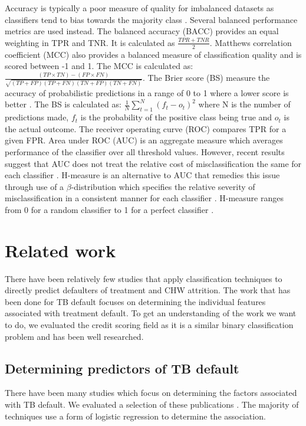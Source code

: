 \documentclass{sig-alternate-05-2015}
\begin{document}
	Accuracy is typically a poor measure of quality for imbalanced datasets as classifiers tend to bias towards the majority class \cite{Batista:2004:SBS:1007730.1007735, Chawla:2004:ESI:1007730.1007733}. Several balanced performance metrics are used instead. The balanced accuracy (BACC) provides an equal weighting in TPR and TNR. It is calculated as $\frac{TPR + TNR}{2}$. Matthews correlation coefficient (MCC) also provides a balanced measure of classification quality and is scored between -1 and 1. The MCC is calculated as: $\frac{(TP \times TN) - (FP \times FN)}{\sqrt{(TP + FP)(TP + FN)(TN + FP)(TN + FN)}}$. The Brier score (BS) measure the accuracy of probabilistic predictions in a range of 0 to 1 where a lower score is better \cite{steyerberg2010assessing}. The BS is calculated as: $\frac{1}{N}\sum_{t=1}^{N}(f_t - o_t)^2$ where N is the number of predictions made, $f_t$ is the probability of the positive class being true and $o_t$ is the actual outcome. The receiver operating curve (ROC) compares TPR for a given FPR. Area under ROC (AUC) is an aggregate measure which averages performance of the classifier over all threshold values. However, recent results suggest that AUC does not treat the relative cost of misclassification the same for each classifier \cite{Hand:2009:MCP:1612990.1613009}. H-measure is an alternative to AUC that remedies this issue through use of a $\beta$-distribution which specifies the relative severity of misclassification in a consistent manner for each classifier \cite{Hand:2009:MCP:1612990.1613009}. H-measure ranges from 0 for a random classifier to 1 for a perfect classifier \cite{Hand:2009:MCP:1612990.1613009}.
	
	\section{Related work}
	There have been relatively few studies that apply classification techniques to directly predict defaulters of treatment and CHW attrition. The work that has been done for TB default focuses on determining the individual features associated with treatment default. To get an understanding of the work we want to do, we evaluated the credit scoring field as it is a similar binary classification problem and has been well researched. 
	\subsection{Determining predictors of TB default}
	\label{predictors_of_defaulters_related_work}
	There have been many studies which focus on determining the factors associated with TB default. We evaluated a selection of these publications \cite{chan:2003prevalence, Jha:10.1371/journal.pone.0008873, jittimanee:10.1111/j.1440-172X.2007.00650.x, Lackey:10356751520150601, muture:6660173120110101, Shargie:10.1371/journal.pmed.0040037}. The majority of techniques use a form of logistic regression to determine the association. 
	
\end{document}
